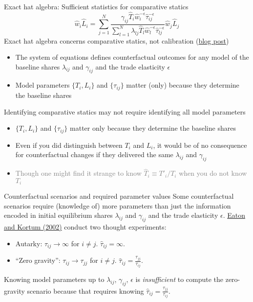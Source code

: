 \documentclass[11pt,notes=hide,aspectratio=169]{beamer}
\begin{document}
\begin{frame}{Exact hat algebra: Sufficient statistics for comparative statics}
\vspace{-3mm}
\begin{equation*}
\hat{w}_i \hat{L}_i
= 
\sum_{j=1}^{N}
\frac{\gamma_{ij} \hat{T}_{i} \hat{w}_{i}^{-\epsilon}\hat{\tau}_{ij}^{-\epsilon}}
{\sum_{l=1}^{N} \lambda_{lj} \hat{T}_{l} \hat{w}_l^{-\epsilon}\hat{\tau}_{lj}^{-\epsilon}}
\hat{w}_j \hat{L}_j
\end{equation*}
Exact hat algebra concerns comparative statics, not calibration (\href{https://tradediversion.net/2023/10/02/exact-hat-algebra-concerns-comparative-statics-not-calibration/}{blog post})
\begin{itemize}
\item The system of equations defines counterfactual outcomes for any model of the baseline shares $\lambda_{ij}$ and $\gamma_{ij}$ and the trade elasticity $\epsilon$
\item Model parameters $\{T_i,L_i\}$ and $\{\tau_{ij}\}$ matter (only) because they determine the baseline shares %
\end{itemize}
Identifying comparative statics may not require identifying all model parameters
\begin{itemize}
\item $\{T_i,L_i\}$ and $\{\tau_{ij}\}$ matter only because they determine the baseline shares
\item Even if you did distinguish between $T_i$ and $L_i$, it would be of no consequence for counterfactual changes if they delivered the same $\lambda_{ij}$ and $\gamma_{ij}$
\item \textcolor{gray}{Though one might find it strange to know $\hat{T}_{i} \equiv T'_i / T_i$ when you do not know $T_i$}
\end{itemize}
\end{frame}
\begin{frame}{Counterfactual scenarios and required parameter values}
Some counterfactual scenarios require (knowledge of) more parameters than
just the information encoded in 
initial equilibrium shares $\lambda_{ij}$ and $\gamma_{ij}$ and
the trade elasticity $\epsilon$.
\href{https://doi.org/10.1111/1468-0262.00352}{Eaton and Kortum (2002)} conduct two thought experiments:
\begin{itemize}
\item Autarky: $\tau_{ij} \to \infty$ for $i \neq j$. $\hat{\tau}_{ij} = \infty$.
\item ``Zero gravity'': $\tau_{ij} \to \tau_{jj}$ for $i \neq j$. $\hat{\tau}_{ij} = \frac{\tau_{jj}}{\tau_{ij}}$.
\end{itemize}
Knowing model parameters up to $\lambda_{ij}$, $\gamma_{ij}$, $\epsilon$
is \textit{insufficient} to compute the zero-gravity scenario
because that requires knowing $\hat{\tau}_{ij} = \frac{\tau_{jj}}{\tau_{ij}}$.
\end{frame}
\end{document}
